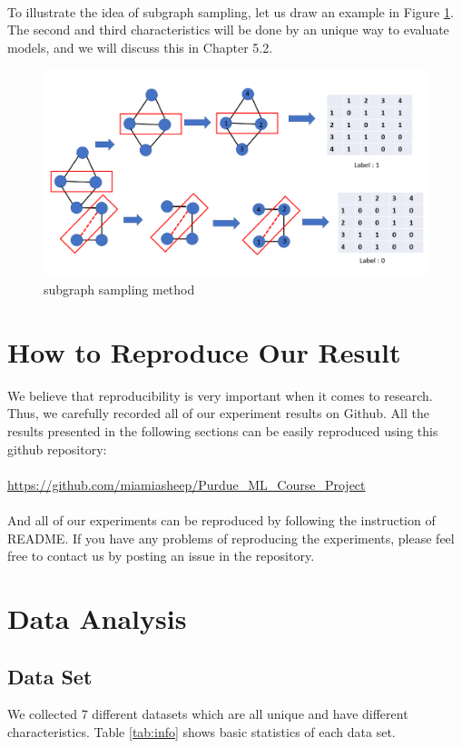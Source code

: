 \documentclass[12pt]{article}
\begin{document}
\\ 
To illustrate the idea of subgraph sampling, let us draw an example in Figure \ref{fig:subsample}. 
\\
The second and third characteristics will be done by an unique way to evaluate models, and we will discuss this in Chapter 5.2. 
\\
\begin{figure}[h]
	\centering
	\includegraphics[scale=0.5]{subgraph_sampling_approach}
	\caption{subgraph sampling method}
	\label{fig:subsample}
\end{figure}

\section{How to Reproduce Our Result}
We believe that reproducibility is very important when it comes to research. Thus, we carefully recorded all of our experiment results on Github. All the results presented in the following sections can be easily reproduced using this github repository: 
\\
\\
\url{https://github.com/miamiasheep/Purdue\_ML\_Course\_Project}
\\
\\
And all of our experiments can be reproduced by following the instruction of README. If you have any problems of reproducing the experiments, please feel free to contact us by posting an issue in the repository.

\section{Data Analysis}

\subsection {Data Set}
We collected 7 different datasets which are all unique and have different characteristics. Table \ref{tab:info} shows basic statistics of each data set.
\end{document}
